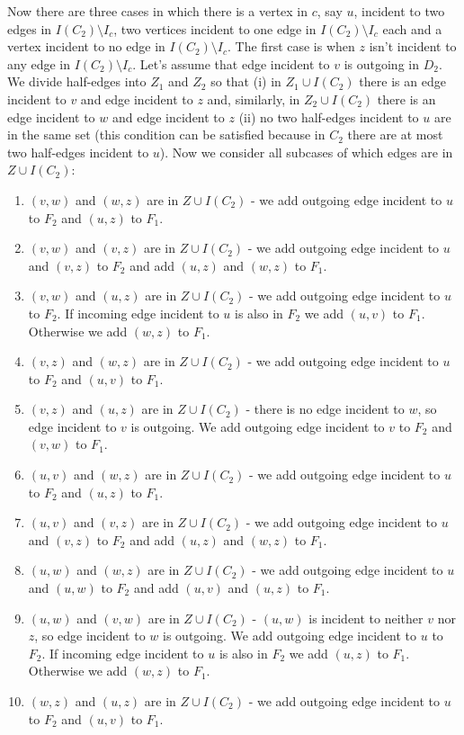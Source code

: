 \documentclass[a4, 11pt]{article}
\newcommand{\<}{\langle}
\renewcommand{\>}{\rangle}
\begin{document}
Now there are three cases in which there is a vertex in $c$, say $u$, incident to two edges in $I(C_2)\setminus I_c$, two vertices incident to one edge in $I(C_2) \setminus I_c$ each and a vertex incident to no edge in $I(C_2) \setminus I_c$. The first case is when $z$ isn't incident to any edge in $I(C_2) \setminus I_c$. Let's assume that edge incident to $v$ is outgoing in $D_2$. We divide half-edges into $Z_1$ and $Z_2$ so that (i) in $Z_1 \cup I(C_2)$ there is an edge incident to $v$ and edge incident to $z$ and, similarly, in $Z_2 \cup I(C_2)$ there is an edge incident to $w$ and edge incident to $z$ (ii) no two half-edges incident to $u$ are in the same set (this condition can be satisfied because in $C_2$ there are at most two half-edges incident to $u$). Now we consider all subcases of which edges are in $Z \cup I(C_2)$:
\begin{enumerate}
	\item $(v,w)$ and $(w,z)$ are in $Z \cup I(C_2)$ - we add outgoing edge incident to $u$ to $F_2$ and $(u,z)$ to $F_1$.
	\item $(v,w)$ and $(v,z)$ are in $Z \cup I(C_2)$ - we add outgoing edge incident to $u$ and $(v,z)$ to $F_2$ and add $(u,z)$ and $(w,z)$ to $F_1$.
	\item $(v,w)$ and $(u,z)$ are in $Z \cup I(C_2)$ - we add outgoing edge incident to $u$ to $F_2$. If incoming edge incident to $u$ is also in $F_2$ we add $(u,v)$ to $F_1$. Otherwise we add $(w,z)$ to $F_1$.
	\item $(v,z)$ and $(w,z)$ are in $Z \cup I(C_2)$ - we add outgoing edge incident to $u$ to $F_2$ and $(u,v)$ to $F_1$.
	\item $(v,z)$ and $(u,z)$ are in $Z \cup I(C_2)$ - there is no edge incident to $w$, so edge incident to $v$ is outgoing. We add outgoing edge incident to $v$ to $F_2$ and $(v,w)$ to $F_1$.
	\item $(u,v)$ and $(w,z)$ are in $Z \cup I(C_2)$ - we add outgoing edge incident to $u$ to $F_2$ and $(u,z)$ to $F_1$.
	\item $(u,v)$ and $(v,z)$ are in $Z \cup I(C_2)$ - we add outgoing edge incident to $u$ and $(v,z)$ to $F_2$ and add $(u,z)$ and $(w,z)$ to $F_1$.
	\item $(u,w)$ and $(w,z)$ are in $Z \cup I(C_2)$ - we add outgoing edge incident to $u$ and $(u,w)$ to $F_2$ and add $(u,v)$ and $(u,z)$ to $F_1$.
	\item $(u,w)$ and $(v,w)$ are in $Z \cup I(C_2)$ - $(u,w)$ is incident to neither $v$ nor $z$, so edge incident to $w$ is outgoing. We add outgoing edge incident to $u$ to $F_2$. If incoming edge incident to $u$ is also in $F_2$ we add $(u,z)$ to $F_1$. Otherwise we add $(w,z)$ to $F_1$.
	\item $(w,z)$ and $(u,z)$ are in $Z \cup I(C_2)$ - we add outgoing edge incident to $u$ to $F_2$ and $(u,v)$ to $F_1$.
\end{enumerate}
\end{document}
